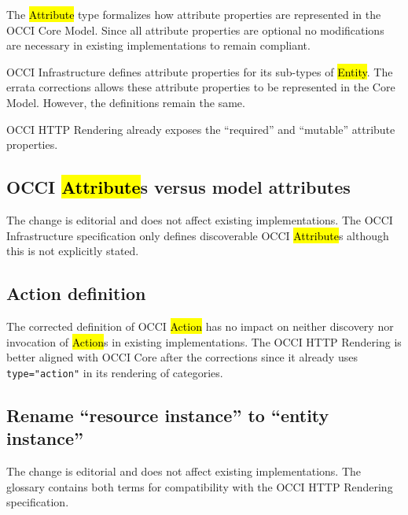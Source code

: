 \documentclass[10pt,a4paper]{article}
\begin{document}
The \hl{Attribute} type formalizes how attribute properties are represented in
the OCCI Core Model. Since all attribute properties are optional no modifications
are necessary in existing implementations to remain compliant.

OCCI Infrastructure \cite{occi:infrastructure} defines attribute properties for
its sub-types of \hl{Entity}. The errata corrections allows these attribute
properties to be represented in the Core Model. However, the definitions remain the
same.

OCCI HTTP Rendering \cite{occi:http_rendering} already exposes the ``required'' and
``mutable'' attribute properties.

\subsection{OCCI \hl{Attribute}s versus model attributes}

The change is editorial and does not affect existing implementations.
%
The OCCI Infrastructure \cite{occi:infrastructure} specification only defines
discoverable OCCI \hl{Attribute}s although this is not explicitly stated.

\subsection{Action definition}

The corrected definition of OCCI \hl{Action} has no impact on neither discovery
nor invocation of \hl{Action}s in existing implementations. The OCCI HTTP Rendering
\cite{occi:http_rendering} is better aligned with OCCI Core after the corrections
since it already uses {\tt type="action"} in its rendering of categories.

\subsection{Rename ``resource instance'' to ``entity instance''}

The change is editorial and does not affect existing implementations.
%
The glossary contains both terms for compatibility with the OCCI HTTP Rendering
\cite{occi:http_rendering} specification.
\end{document}
